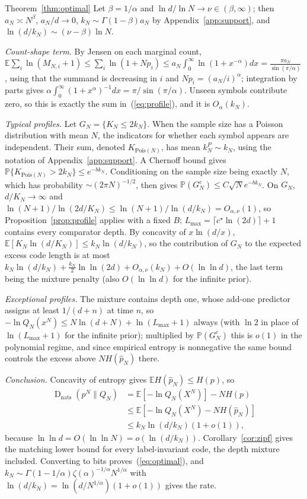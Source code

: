 \documentclass[anon]{alt2027}
\newcommand{\E}{\mathbb{E}}
\newcommand{\Prob}{\mathbb{P}}
\newcommand{\cstar}{c^{\star}}
\newcommand{\Lmax}{L_{\max}}
\newcommand{\KL}{\operatorname{D}}
\renewcommand{\eqref}[1]{(\ref{#1})}
\begin{document}
\begin{proofof}{Theorem~\ref{thm:optimal}}
Let $\beta=1/\alpha$ and $\ln d/\ln N\to\nu\in(\beta,\infty)$; then $a_N\asymp N^\beta$, $a_N/d\to0$, $k_N\sim\Gamma(1-\beta)a_N$ by Appendix~\ref{app:support}, and $\ln(d/k_N)\sim(\nu-\beta)\ln N$.

\emph{Count-shape term.} By Jensen on each marginal count, $\E\sum_i\ln(M_{N,i}+1)\le\sum_i\ln(1+Np_i)\le a_N\int_0^\infty\ln(1+x^{-\alpha})dx=\frac{\pi a_N}{\sin(\pi/\alpha)}$, using that the summand is decreasing in $i$ and $Np_i=(a_N/i)^\alpha$; integration by parts gives $\alpha\int_0^\infty(1+x^\alpha)^{-1}dx=\pi/\sin(\pi/\alpha)$. Unseen symbols contribute zero, so this is exactly the sum in~\eqref{eq:profile}, and it is $O_\alpha(k_N)$.

\emph{Typical profiles.} Let $G_N=\{K_N\le2k_N\}$. When the sample size has a Poisson distribution with mean $N$, the indicators for whether each symbol appears are independent. Their sum, denoted $K_{\mathrm{Pois}(N)}$, has mean $k_N^P\sim k_N$, using the notation of Appendix~\ref{app:support}. A Chernoff bound gives $\Prob\{K_{\mathrm{Pois}(N)}>2k_N\}\le e^{-bk_N}$. Conditioning on the sample size being exactly $N$, which has probability $\sim(2\pi N)^{-1/2}$, then gives $\Prob(G_N^c)\le C\sqrt Ne^{-bk_N}$. On $G_N$, $d/K_N\to\infty$ and $\ln(N+1)/\ln(2d/K_N)\le\ln(N+1)/\ln(d/k_N)=O_{\alpha,\nu}(1)$, so Proposition~\ref{prop:profile} applies with a fixed $B$; $\Lmax=\lceil\cstar\ln(2d)\rceil+1$ contains every comparator depth. By concavity of $x\ln(d/x)$, $\E[K_N\ln(d/K_N)]\le k_N\ln(d/k_N)$, so the contribution of $G_N$ to the expected excess code length is at most $k_N\ln(d/k_N)+\frac{k_N}2\ln\ln(2d)+O_{\alpha,\nu}(k_N)+O(\ln\ln d)$, the last term being the mixture penalty (also $O(\ln\ln d)$ for the infinite prior).

\emph{Exceptional profiles.} The mixture contains depth one, whose add-one predictor assigns at least $1/(d+n)$ at time $n$, so $-\ln Q_N(x^N)\le N\ln(d+N)+\ln(\Lmax+1)$ always (with $\ln 2$ in place of $\ln(\Lmax+1)$ for the infinite prior); multiplied by $\Prob(G_N^c)$ this is $o(1)$ in the polynomial regime, and since empirical entropy is nonnegative the same bound controls the excess above $NH(\hat p_N)$ there.

\emph{Conclusion.} Concavity of entropy gives $\E H(\hat p_N)\le H(p)$, so \[\begin{aligned}\KL_{\mathrm{nats}}(p^N\|Q_N)&=\E[-\ln Q_N(X^N)]-NH(p)\\&\le\E[-\ln Q_N(X^N)-NH(\hat p_N)]\\&\le k_N\ln(d/k_N)(1+o(1)),\end{aligned}\]
because $\ln\ln d=O(\ln\ln N)=o(\ln(d/k_N))$. Corollary~\ref{cor:zipf} gives the matching lower bound for every label-invariant code, the depth mixture included. Converting to bits proves~\eqref{eq:optimal}, and $k_N\sim\Gamma(1-1/\alpha)\zeta(\alpha)^{-1/\alpha}N^{1/\alpha}$ with $\ln(d/k_N)=\ln(d/N^{1/\alpha})(1+o(1))$ gives the rate.
\end{proofof}
\end{document}
